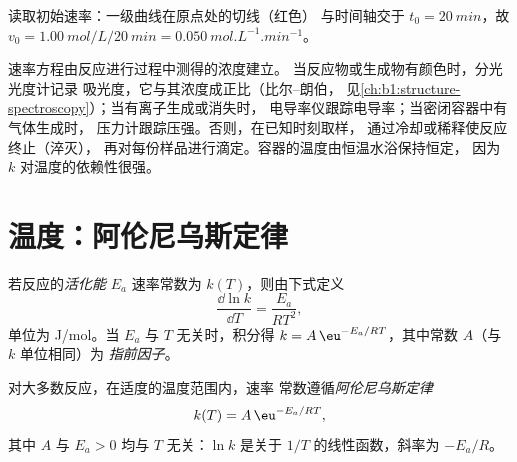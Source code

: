 \begin{omfigure}

{\small 读取初始速率：一级曲线在原点处的切线（红色）
与时间轴交于 $t_0 = \qty{20}{min}$，故 $v_0 =
\qty{1.00}{mol/L}/\qty{20}{min} = \qty{0.050}{mol.L^{-1}.min^{-1}}$。}
\end{omfigure}

\begin{inthelab}[跟踪反应随时间的变化]
速率方程由反应进行过程中测得的浓度建立。
当反应物或生成物有颜色时，分光光度计记录
吸光度，它与其浓度成正比（比尔–朗伯，
见\cref{ch:b1:structure-spectroscopy}）；当有离子生成或消失时，
电导率仪跟踪电导率；当密闭容器中有气体生成时，
压力计跟踪压强。否则，在已知时刻取样，
通过冷却或稀释使反应终止（淬灭），
再对每份样品进行滴定。容器的温度由恒温水浴保持恒定，
因为 $k$ 对温度的依赖性很强。
\end{inthelab}

\section{温度：阿伦尼乌斯定律}

\begin{definition}[活化能]\label{def:b1:rate-laws:activation-energy}
若反应的\emph{活化能} $E_a$
速率常数为 $k(T)$，则由下式定义
\[
  \frac{\dd \ln k}{\dd T} = \frac{E_a}{RT^2} ,
\]
单位为 \unit{J/mol}。当 $E_a$ 与 $T$ 无关时，积分得
$k = A\,\eu^{-E_a/RT}$，其中常数 $A$（与 $k$ 单位相同）为
\emph{指前因子}。
\end{definition}

\begin{theorem}[阿伦尼乌斯定律]\label{thm:b1:rate-laws:arrhenius}
对大多数反应，在适度的温度范围内，速率
常数遵循\emph{阿伦尼乌斯定律}
\[
  k(T) = A\,\eu^{-E_a/RT} ,
\]
其中 $A$ 与 $E_a > 0$ 均与 $T$ 无关：$\ln k$ 是关于
$1/T$ 的线性函数，斜率为 $-E_a/R$。
\end{theorem}
\admitted

